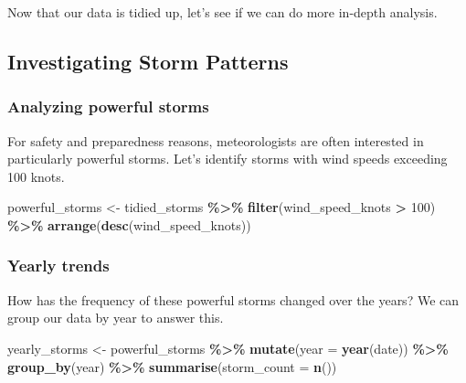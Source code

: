 \documentclass[
]{book}
\newenvironment{Shaded}{\begin{snugshade}}{\end{snugshade}}
\newcommand{\AttributeTok}[1]{\textcolor[rgb]{0.13,0.29,0.53}{#1}}
\newcommand{\DecValTok}[1]{\textcolor[rgb]{0.00,0.00,0.81}{#1}}
\newcommand{\FunctionTok}[1]{\textcolor[rgb]{0.13,0.29,0.53}{\textbf{#1}}}
\newcommand{\NormalTok}[1]{#1}
\newcommand{\OtherTok}[1]{\textcolor[rgb]{0.56,0.35,0.01}{#1}}
\newcommand{\SpecialCharTok}[1]{\textcolor[rgb]{0.81,0.36,0.00}{\textbf{#1}}}
\begin{document}
Now that our data is tidied up, let's see if we can do more in-depth analysis.

\hypertarget{investigating-storm-patterns}{%
\subsection{Investigating Storm Patterns}\label{investigating-storm-patterns}}

\hypertarget{analyzing-powerful-storms}{%
\subsubsection{Analyzing powerful storms}\label{analyzing-powerful-storms}}

For safety and preparedness reasons, meteorologists are often interested in particularly powerful storms. Let's identify storms with wind speeds exceeding 100 knots.

\begin{Shaded}
\begin{Highlighting}[]
\NormalTok{powerful\_storms }\OtherTok{\textless{}{-}}\NormalTok{ tidied\_storms }\SpecialCharTok{\%\textgreater{}\%}
  \FunctionTok{filter}\NormalTok{(wind\_speed\_knots }\SpecialCharTok{\textgreater{}} \DecValTok{100}\NormalTok{) }\SpecialCharTok{\%\textgreater{}\%}
  \FunctionTok{arrange}\NormalTok{(}\FunctionTok{desc}\NormalTok{(wind\_speed\_knots))}
\end{Highlighting}
\end{Shaded}

\hypertarget{yearly-trends}{%
\subsubsection{Yearly trends}\label{yearly-trends}}

How has the frequency of these powerful storms changed over the years? We can group our data by year to answer this.

\begin{Shaded}
\begin{Highlighting}[]
\NormalTok{yearly\_storms }\OtherTok{\textless{}{-}}\NormalTok{ powerful\_storms }\SpecialCharTok{\%\textgreater{}\%}
  \FunctionTok{mutate}\NormalTok{(}\AttributeTok{year =} \FunctionTok{year}\NormalTok{(date)) }\SpecialCharTok{\%\textgreater{}\%}
  \FunctionTok{group\_by}\NormalTok{(year) }\SpecialCharTok{\%\textgreater{}\%}
  \FunctionTok{summarise}\NormalTok{(}\AttributeTok{storm\_count =} \FunctionTok{n}\NormalTok{())}
\end{Highlighting}
\end{Shaded}
\end{document}
